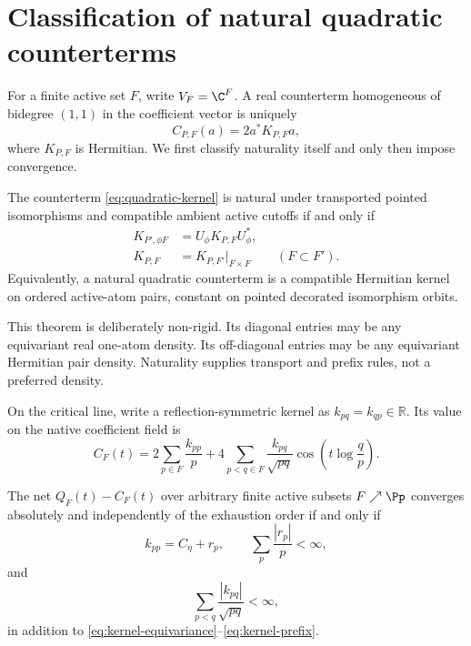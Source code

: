 \section{Classification of natural quadratic counterterms}
\label{sec:classification}

For a finite active set $F$, write $V_F=\C^F$.  A real counterterm
homogeneous of bidegree $(1,1)$ in the coefficient vector is uniquely
\begin{equation}
 C_{P,F}(a)=2a^*K_{P,F}a,
 \label{eq:quadratic-kernel}
\end{equation}
where $K_{P,F}$ is Hermitian.  We first classify naturality itself and only
then impose convergence.

\begin{theorem}
\label{thm:natural-kernels}
The counterterm \eqref{eq:quadratic-kernel} is natural under transported
pointed isomorphisms and compatible ambient active cutoffs if and only if
\begin{align}
 K_{P',\phi F}&=U_\phi K_{P,F}U_\phi^*,
 \label{eq:kernel-equivariance}\\
 K_{P,F}&=K_{P,F'}|_{F\times F}
 \qquad(F\subset F').
 \label{eq:kernel-prefix}
\end{align}
Equivalently, a natural quadratic counterterm is a compatible Hermitian
kernel on ordered active-atom pairs, constant on pointed decorated
isomorphism orbits.
\end{theorem}

This theorem is deliberately non-rigid.  Its diagonal entries may be any
equivariant real one-atom density.  Its off-diagonal entries may be any
equivariant Hermitian pair density.  Naturality supplies transport and prefix
rules, not a preferred density.

On the critical line, write a reflection-symmetric kernel as
$k_{pq}=k_{qp}\in\mathbb R$.  Its value on the native coefficient field is
\begin{equation}
 C_F(t)=2\sum_{p\in F}\frac{k_{pp}}p
 +4\sum_{p<q\in F}\frac{k_{pq}}{\sqrt{pq}}
 \cos\!\left(t\log\frac qp\right).
 \label{eq:critical-counterterm}
\end{equation}

\begin{theorem}
\label{thm:scheme-classification}
The net $Q_F(t)-C_F(t)$ over arbitrary finite active subsets
$F\nearrow\Pp$ converges absolutely and independently of the exhaustion
order if and only if
\begin{equation}
 k_{pp}=C_\eta+r_p,
 \qquad
 \sum_p\frac{|r_p|}{p}<\infty,
 \label{eq:diag-classification}
\end{equation}
and
\begin{equation}
 \sum_{p<q}\frac{|k_{pq}|}{\sqrt{pq}}<\infty,
 \label{eq:mixed-classification}
\end{equation}
in addition to \eqref{eq:kernel-equivariance}--\eqref{eq:kernel-prefix}.
\end{theorem}

